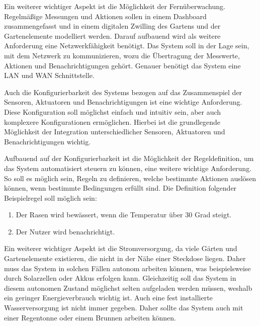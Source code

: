 Ein weiterer wichtiger Aspekt ist die Möglichkeit der Fernüberwachung.
Regelmäßige Messungen und Aktionen sollen in einem Dashboard zusammengefasst und in einem digitalen Zwilling des Gartens und der Gartenelemente modelliert werden.
Darauf aufbauend wird als weitere Anforderung eine Netzwerkfähigkeit benötigt.
Das System soll in der Lage sein, mit dem Netzwerk zu kommunizieren, wozu die Übertragung der Messwerte, Aktionen und Benachrichtigungen gehört.
Genauer benötigt das System eine LAN und WAN Schnittstelle.

Auch die Konfigurierbarkeit des Systems bezogen auf das Zusammenspiel der Sensoren, Aktuatoren und Benachrichtigungen ist eine wichtige Anforderung.
Diese Konfiguration soll möglichst einfach und intuitiv sein, aber auch komplexere Konfigurationen ermöglichen.
Hierbei ist die grundlegende Möglichkeit der Integration unterschiedlicher Sensoren, Aktuatoren und Benachrichtigungen wichtig.

Aufbauend auf der Konfigurierbarkeit ist die Möglichkeit der Regeldefinition, um das System automatisiert steuern zu können, eine weitere wichtige Anforderung.
So soll es möglich sein, Regeln zu definieren, welche bestimmte Aktionen auslösen können, wenn bestimmte Bedingungen erfüllt sind.
Die Definition folgender Beispielregel soll möglich sein:
\begin{enumerate}
	\item Der Rasen wird bewässert, wenn die Temperatur über 30 Grad steigt.
	\item Der Nutzer wird benachrichtigt.
\end{enumerate}

Ein weiterer wichtiger Aspekt ist die Stromversorgung, da viele Gärten und Gartenelemente existieren, die nicht in der Nähe einer Steckdose liegen.
Daher muss das System in solchen Fällen autonom arbeiten können, was beispielsweise durch Solarzellen oder Akkus erfolgen kann.
Gleichzeitig soll das System in diesem autonomen Zustand möglichst selten aufgeladen werden müssen, weshalb ein geringer Energieverbrauch wichtig ist.
Auch eine fest installierte Wasserversorgung ist nicht immer gegeben.
Daher sollte das System auch mit einer Regentonne oder einem Brunnen arbeiten können.

